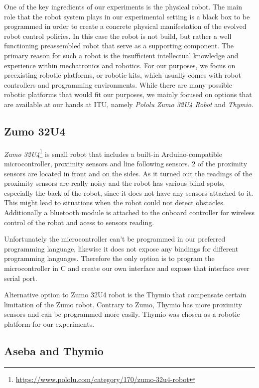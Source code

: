 \documentclass[format=acmsmall, review=false, screen=true]{acmart}
\begin{document}
One of the key ingredients of our experiments is the physical robot. The main role that the robot system plays in our experimental setting is a black box to be programmed in order to create a concrete physical manifestation of the evolved robot control policies. In this case the robot is not build, but rather a well functioning preassembled robot that serve as a supporting component. The primary reason for such a robot is the insufficient intellectual knowledge and experience within mechatronics and robotics. For our purposes, we focus on preexisting robotic platforms, or robotic kits, which usually comes with robot controllers and programming environments. While there are many possible robotic platforms that would fit our purposes, we mainly focused on options that are available at our hands at ITU, namely \emph{Pololu Zumo 32U4 Robot} and \emph{Thymio}.

\subsection{Zumo 32U4}

\emph{Zumo 32U4}\footnote{\url{https://www.pololu.com/category/170/zumo-32u4-robot}} is small robot that includes a built-in Arduino-compatible microcontroller, proximity sensors and line following sensors. 2 of the proximity sensors are located in front and on the sides. As it turned out the readings of the proximity sensors are really noisy and the robot has various blind spots, especially the back of the robot, since it does not have any sensors attached to it. This might lead to situations when the robot could not detect obstacles. Additionally a bluetooth module is attached to the onboard controller for wireless control of the robot and acess to sensors reading.

Unfortunately the microcontroller can't be programmed in our preferred programming language, likewise it does not expose any bindings for different programming languages. Therefore the only option is to program the microcontroller in C and create our own interface and expose that interface over serial port.

Alternative option to Zumo 32U4 robot is the Thymio that compensate certain limitation of the Zumo robot. Contrary to Zumo, Thymio has more proximity sensors and can be programmed more easily. Thymio was chosen as a robotic platform for our experiments.

\subsection{Aseba and Thymio}
\end{document}
